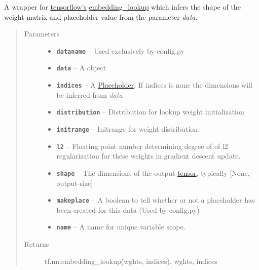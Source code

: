 \documentclass[letterpaper,10pt,english]{sphinxmanual}
\begin{document}

\begin{fulllineitems}
\label{node_ops:node_ops.lookup}
A wrapper for \href{https://www.tensorflow.org/}{tensorflow's} \href{https://www.tensorflow.org/versions/r0.7/api\_docs/python/nn.html\#embeddings}{embedding\_lookup} which infers the shape of the
weight matrix and placeholder value from the parameter \emph{data}.
\begin{quote}\begin{description}
\item[{Parameters}] \leavevmode\begin{itemize}
\item {} 
\textbf{\texttt{dataname}} -- Used exclusively by config.py

\item {} 
\textbf{\texttt{data}} -- A {\hyperref[loader:loader.HotIndex]{\emph{}}} object

\item {} 
\textbf{\texttt{indices}} -- A \href{https://www.tensorflow.org/versions/r0.7/api\_docs/python/io\_ops.html\#placeholders}{Placeholder}. If indices is none the dimensions will be inferred from \emph{data}

\item {} 
\textbf{\texttt{distribution}} -- Distribution for lookup weight initialization

\item {} 
\textbf{\texttt{initrange}} -- Initrange for weight distribution.

\item {} 
\textbf{\texttt{l2}} -- Floating point number determining degree of of l2 regularization for these weights in gradient descent update.

\item {} 
\textbf{\texttt{shape}} -- The dimensions of the output \href{https://www.tensorflow.org/versions/r0.7/api\_docs/python/framework.html\#Tensor}{tensor}, typically {[}None, output-size{]}

\item {} 
\textbf{\texttt{makeplace}} -- A boolean to tell whether or not a placeholder has been created for this data (Used by config.py)

\item {} 
\textbf{\texttt{name}} -- A name for unique variable scope.

\end{itemize}

\item[{Returns}] \leavevmode
tf.nn.embedding\_lookup(wghts, indices), wghts, indices

\end{description}\end{quote}

\end{fulllineitems}
\end{document}
